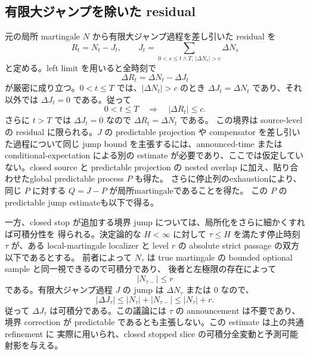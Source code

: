 \subsection{有限大ジャンプを除いた residual}

元の局所 martingale $N$ から有限大ジャンプ過程を差し引いた residual を
\[
 R_t=N_t-J_t,
 \qquad
 J_t=\sum_{0<s\le t\wedge T,\,|\Delta N_s|>c}\Delta N_s
\]
と定める。left limit を用いると全時刻で
\[
 \Delta R_t=\Delta N_t-\Delta J_t
\]
が厳密に成り立つ。$0<t\le T$ では、$|\Delta N_t|>c$ のとき
$\Delta J_t=\Delta N_t$ であり、それ以外では $\Delta J_t=0$ である。従って
\[
 0<t\le T\quad\Longrightarrow\quad |\Delta R_t|\le c .
\]
さらに $t>T$ では $\Delta J_t=0$ なので $\Delta R_t=\Delta N_t$ である。
この境界は source-level の residual に限られる。$J$ の predictable projection や
compensator を差し引いた過程について同じ jump bound を主張するには、announced-time または
conditional-expectation による別の estimate が必要であり、ここでは仮定していない。closed source
と predictable projection の nested overlap に加え、貼り合わせたglobal predictable process $P$ も得た。
さらに停止列のexhaustionにより、同じ $P$ に対する $Q=J-P$ が局所martingaleであることを得た。
この $P$ のpredictable jump estimateも以下で得る。

一方、closed stop が追加する境界 jump については、局所化をさらに細かくすれば可積分性を
得られる。決定論的な $H<\infty$ に対して $\tau\leq H$ を満たす停止時刻 $\tau$ が、ある
local-martingale localizer と level $r$ の absolute strict passage の双方以下であるとする。
前者によって $N_\tau$ は true martingale の bounded optional sample と同一視できるので可積分であり、
後者と左極限の存在によって
\[
  |N_{\tau-}|\le r
\]
である。有限大ジャンプ過程 $J$ の jump は $\Delta N_\tau$ または $0$ なので、
\[
  |\Delta J_\tau|
  \le |N_\tau|+|N_{\tau-}|
  \le |N_\tau|+r .
\]
従って $\Delta J_\tau$ は可積分である。この議論には $\tau$ の announcement は不要であり、
境界 correction が predictable であるとも主張しない。この estimate は上の共通 refinement に
実際に用いられ、closed stopped slice の可積分全変動と予測可能射影を与える。

